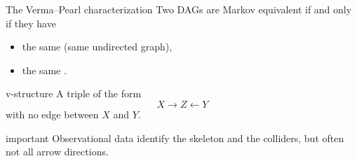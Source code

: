 \documentclass[dvipsnames,aspectratio=169,handout]{beamer}
\begin{document}
\begin{frame}{The Verma--Pearl characterization}
Two DAGs are Markov equivalent if and only if they have
\begin{itemize}
    \item the same  (same undirected graph),
    \item the same .
\end{itemize}

\begin{block}{v-structure}
A triple of the form
\[
X\to Z\leftarrow Y
\]
with no edge between $X$ and $Y$.
\end{block}

\begin{beamercolorbox}[wd=\textwidth,sep=7pt,center,rounded=true,shadow=true]{important}
Observational data identify the skeleton and the colliders, but often not all arrow directions.
\end{beamercolorbox}
\end{frame}
\end{document}
